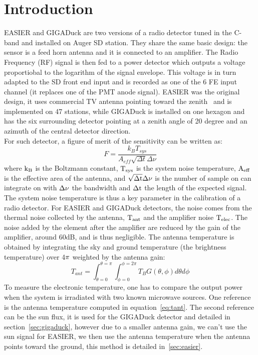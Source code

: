 \section*{Introduction}
EASIER and GIGADuck are two versions  of a radio detector tuned in the
C-band and  installed on Auger SD  station. They share  the same basic
design: the  sensor is a feed horn  antenna and it is  connected to an
amplifier.  The  Radio Frequency  (RF) signal is  then fed to  a power
detector which outputs a voltage  proportiobal to the logarithm of the
signal envelope. This  voltage is in turn adapted to  the SD front end
input and  is recorded as one of  the 6 FE input  channel (it replaces
one of the PMT anode signal).  EASIER was the original design, it uses
commercial TV antenna  pointing toward the zenith~\cite{gapeasier} and
is  implemented on  47 stations,  while GIGADuck  is installed  on one
hexagon  and has  the six  surrounding detector  pointing at  a zenith
angle of 20 degree and  an azimuth of the central detector\cite{gapGD}
direction.\\For such  detector, a figure  of merit of  the sensitivity
can be written as:
\begin{equation}
  F = \frac{k_{B}T_{sys}}{A_{eff}\sqrt{\Delta t}{\Delta \nu}}
\end{equation}
where $\rm  k_{B}$ is  the Boltzmann constant,  $\rm T_{sys}$  is the
system noise temperature,  $\rm A_{eff}$ is the effective  area of the
antenna, and $\rm \sqrt{\Delta t}{\Delta \nu}$ is the number of sample
on  can integrate  on with  $\rm \Delta  \nu$ the  bandwidth  and $\rm
\Delta  t$ the  length  of  the expected  signal.\\  The system  noise
temperature  is thus a  key parameter  in the  calibration of  a radio
detector. For EASIER and GIGADuck  detectors, the noise comes from the
thermal  noise  collected by  the  antenna,  $\rm  T_{ant} $  and  the
amplifier noise $\rm  T_{elec}$. The noise added by  the element after
the amplifier are  reduced by the gain of  the amplifier, around 60dB,
and  is  thus negligible.   The  antenna  temperature  is obtained  by
integrating   the   sky  and   ground   temperature  (the   brightness
temperature) over 4$\rm \pi$ weighted by the antenna gain:
\begin{equation}
  T_{ant} = \int_{\theta =  0}^{\theta = \pi}\int_{\phi = 0}^{\phi =
    2\pi} T_{B} G(\theta,\phi) d\theta d\phi
\label{eq:tant}
\end{equation}
To measure the  electronic temperature, one has to  compare the output
power when the system is  irradiated with two known microwave sources.
One    reference   is    the   antenna    temperature    computed   in
equation~\ref{eq:tant}. The  second reference can be the  sun flux, it
is    used   for    the    GIGADuck   detector    and   detailed    in
section~\ref{sec:gigaduck}, however due to  a smaller antenna gain, we
can't  use  the  sun  signal  for  EASIER, we  then  use  the  antenna
temperature when the antenna points  toward the ground, this method is
detailed in~\ref{sec:easier}.


